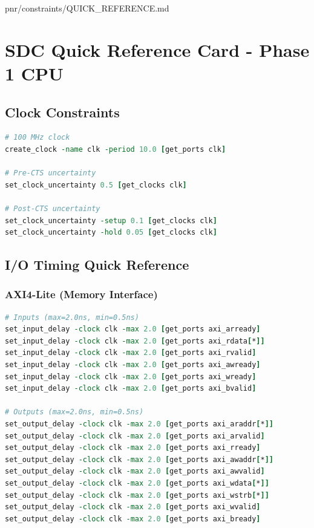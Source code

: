 \begin{relocated}{pnr/constraints/QUICK_REFERENCE.md}
\section{SDC Quick Reference Card - Phase 1 CPU}\label{tm:pd:constraints-quick-reference}

\subsection{Clock Constraints}\label{tm:pd:constraints-quick-reference:clock-constraints}

\begin{lstlisting}[language=tcl]
# 100 MHz clock
create_clock -name clk -period 10.0 [get_ports clk]

# Pre-CTS uncertainty
set_clock_uncertainty 0.5 [get_clocks clk]

# Post-CTS uncertainty
set_clock_uncertainty -setup 0.1 [get_clocks clk]
set_clock_uncertainty -hold 0.05 [get_clocks clk]
\end{lstlisting}

\subsection{I/O Timing Quick Reference}\label{tm:pd:constraints-quick-reference:io-timing-quick-reference}

\subsubsection{AXI4-Lite (Memory Interface)}\label{tm:pd:constraints-quick-reference:axi4-lite-memory-interface}

\begin{lstlisting}[language=tcl]
# Inputs (max=2.0ns, min=0.5ns)
set_input_delay -clock clk -max 2.0 [get_ports axi_arready]
set_input_delay -clock clk -max 2.0 [get_ports axi_rdata[*]]
set_input_delay -clock clk -max 2.0 [get_ports axi_rvalid]
set_input_delay -clock clk -max 2.0 [get_ports axi_awready]
set_input_delay -clock clk -max 2.0 [get_ports axi_wready]
set_input_delay -clock clk -max 2.0 [get_ports axi_bvalid]

# Outputs (max=2.0ns, min=0.5ns)
set_output_delay -clock clk -max 2.0 [get_ports axi_araddr[*]]
set_output_delay -clock clk -max 2.0 [get_ports axi_arvalid]
set_output_delay -clock clk -max 2.0 [get_ports axi_rready]
set_output_delay -clock clk -max 2.0 [get_ports axi_awaddr[*]]
set_output_delay -clock clk -max 2.0 [get_ports axi_awvalid]
set_output_delay -clock clk -max 2.0 [get_ports axi_wdata[*]]
set_output_delay -clock clk -max 2.0 [get_ports axi_wstrb[*]]
set_output_delay -clock clk -max 2.0 [get_ports axi_wvalid]
set_output_delay -clock clk -max 2.0 [get_ports axi_bready]
\end{lstlisting}


\end{relocated}
